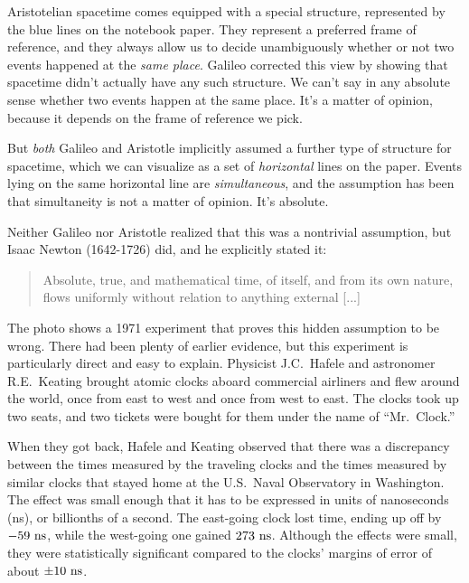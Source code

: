 Aristotelian spacetime comes equipped with a special structure, represented by the blue
lines on the notebook paper. They represent a preferred frame of reference, and they always
allow us to decide unambiguously whether or not two events happened at the \emph{same place}.
Galileo corrected this view by showing that spacetime didn't actually have any such structure.
We can't say in any absolute sense whether two events happen at the same place. It's a matter
of opinion, because it depends on the frame of reference we pick.

But \emph{both} Galileo and Aristotle implicitly assumed a further type of structure
for spacetime, which we can visualize as a set of \emph{horizontal} lines on the paper.
Events lying on the same horizontal line are \emph{simultaneous}, and the assumption has been that
simultaneity is not a matter of opinion. It's absolute.

\pagebreak

Neither Galileo nor Aristotle realized
that this was a nontrivial assumption, but Isaac Newton (1642-1726) did, and he explicitly stated it:
%
\begin{quote}
Absolute, true, and mathematical time, of itself, and from its own nature,
flows uniformly without relation to anything external [...]
\end{quote}

\begin{figure}[h]\label{fig:hk-in-cabin}
\end{figure}

The photo
shows a 1971 experiment that proves this hidden assumption to be wrong.
There had been plenty of earlier evidence, but this experiment is particularly direct and easy to explain.
Physicist J.C.~Hafele and astronomer R.E.~Keating  brought atomic clocks aboard commercial
airliners and flew around the world, once from east to west and once from west to east.
The clocks took up two seats, and two tickets were bought for them under the name of ``Mr.~Clock.''

When they got back, Hafele and Keating observed that there was a discrepancy between the times measured by the
traveling clocks and the times measured by similar clocks that stayed home at the U.S.~Naval Observatory in Washington.
The effect was small enough that it has to be expressed in units of nanoseconds (ns), or billionths of a second.
The east-going clock lost time, ending up off by $-59\ \textup{ns}$, while the west-going 
one gained $273\ \textup{ns}$. Although the effects were small, they were statistically significant compared
to the clocks' margins of error of about $\pm 10\ \zu{ns}$. 

